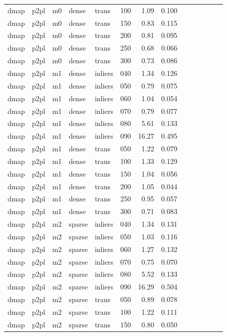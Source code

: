 \begin{table}[htbp]
\begin{tabular}{llllllrrrrrrrr}
  dmap & p2pl & m0 & dense & trans & 100 & 1.09 & 0.100 \\
  dmap & p2pl & m0 & dense & trans & 150 & 0.83 & 0.115 \\
  dmap & p2pl & m0 & dense & trans & 200 & 0.81 & 0.095 \\
  dmap & p2pl & m0 & dense & trans & 250 & 0.68 & 0.066 \\
  dmap & p2pl & m0 & dense & trans & 300 & 0.73 & 0.086 \\
  dmap & p2pl & m1 & dense & inliers & 040 & 1.34 & 0.126 \\
  dmap & p2pl & m1 & dense & inliers & 050 & 0.79 & 0.075 \\
  dmap & p2pl & m1 & dense & inliers & 060 & 1.04 & 0.054 \\
  dmap & p2pl & m1 & dense & inliers & 070 & 0.79 & 0.077 \\
  dmap & p2pl & m1 & dense & inliers & 080 & 5.61 & 0.133 \\
  dmap & p2pl & m1 & dense & inliers & 090 & 16.27 & 0.495 \\
  dmap & p2pl & m1 & dense & trans & 050 & 1.22 & 0.079 \\
  dmap & p2pl & m1 & dense & trans & 100 & 1.33 & 0.129 \\
  dmap & p2pl & m1 & dense & trans & 150 & 1.04 & 0.056 \\
  dmap & p2pl & m1 & dense & trans & 200 & 1.05 & 0.044 \\
  dmap & p2pl & m1 & dense & trans & 250 & 0.95 & 0.057 \\
  dmap & p2pl & m1 & dense & trans & 300 & 0.71 & 0.083 \\
  dmap & p2pl & m2 & sparse & inliers & 040 & 1.34 & 0.131 \\
  dmap & p2pl & m2 & sparse & inliers & 050 & 1.03 & 0.116 \\
  dmap & p2pl & m2 & sparse & inliers & 060 & 1.27 & 0.132 \\
  dmap & p2pl & m2 & sparse & inliers & 070 & 0.75 & 0.070 \\
  dmap & p2pl & m2 & sparse & inliers & 080 & 5.52 & 0.133 \\
  dmap & p2pl & m2 & sparse & inliers & 090 & 16.29 & 0.504 \\
  dmap & p2pl & m2 & sparse & trans & 050 & 0.89 & 0.078 \\
  dmap & p2pl & m2 & sparse & trans & 100 & 1.22 & 0.111 \\
  dmap & p2pl & m2 & sparse & trans & 150 & 0.80 & 0.050 \\

\end{tabular}
\end{table}
